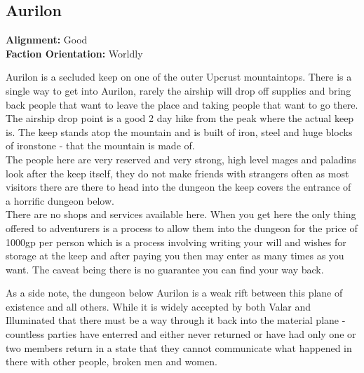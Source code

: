 \documentclass[10pt,twoside,twocolumn]{article}
\begin{document}
\subsection{Aurilon}
\textbf{Alignment:} Good \\
\textbf{Faction Orientation:} Worldly \\
\begin{quotebox}
	Aurilon is a secluded keep on one of the outer Upcrust mountaintops. There is a single way to get into Aurilon, rarely the airship will drop off supplies and bring back people that want to leave the place and taking people that want to go there. The airship drop point is a good 2 day hike from the peak where the actual keep is. The keep stands atop the mountain and is built of iron, steel and huge blocks of ironstone - that the mountain is made of.\\

	The people here are very reserved and very strong, high level mages and paladins look after the keep itself, they do not make friends with strangers often as most visitors there are there to head into the dungeon the keep covers the entrance of a horrific dungeon below.\\

	There are no shops and services available here. When you get here the only thing offered to adventurers is a process to allow them into the dungeon for the price of 1000gp per person which is a process involving writing your will and wishes for storage at the keep and after paying you then may enter as many times as you want. The caveat being there is no guarantee you can find your way back.\\
\end{quotebox}

As a side note, the dungeon below Aurilon is a weak rift between this plane of existence and all others. While it is widely accepted by both Valar and Illuminated that there must be a way through it back into the material plane - countless parties have enterred and either never returned or have had only one or two members return in a state that they cannot communicate what happened in there with other people, broken men and women. \\
\end{document}
